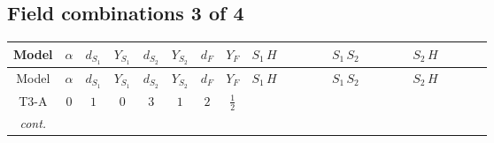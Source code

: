\documentclass[8pt]{article}
\begin{document}
\begin{landscape}
\subsection*{Field combinations 3 of 4}
\begin{longtable}{@{}cccccccc >{\raggedright\arraybackslash}p{0.21\linewidth} >{\raggedright\arraybackslash}p{0.21\linewidth} >{\raggedright\arraybackslash}p{0.21\linewidth}@{}}
\toprule
Model & $\alpha$ & $d_{S_1}$ & $Y_{S_1}$ & $d_{S_2}$ & $Y_{S_2}$ & $d_F$ & $Y_F$ & $S_1\,H$ & $S_1\,S_2$ & $S_2\,H$ \\
\midrule
\endfirsthead
\toprule
Model & $\alpha$ & $d_{S_1}$ & $Y_{S_1}$ & $d_{S_2}$ & $Y_{S_2}$ & $d_F$ & $Y_F$ & $S_1\,H$ & $S_1\,S_2$ & $S_2\,H$ \\
\midrule
\endhead
T3-A & $0$ & $1$ & $0$ & $3$ & $1$ & $2$ & $\frac{1}{2}$ & \scriptsize\adjustbox{max width=\linewidth}{$\begin{gathered} +H_{a_2} S_1 H_{a_1}{}^{\dagger } S_1{}^{\dagger } \mathcal{I}_{H1,a_1,a_2}{}^1 \lambda_{HS_1}^{(1)}^{(1)}\end{gathered}$} & \scriptsize\adjustbox{max width=\linewidth}{$\begin{gathered} +S_1 S_{2,j_2} S_1{}^{\dagger } S_{2,j_1}{}^{\dagger } \mathcal{I}_{12,j_1,j_2}{}^1 \lambda_{12}^{(1)}^{(1)}\end{gathered}$} & \scriptsize\adjustbox{max width=\linewidth}{$\begin{gathered} +\frac{1}{2} H_{a_2} S_{2,j_2} H_{a_1}{}^{\dagger } S_{2,j_1}{}^{\dagger } \mathcal{I}_{H2,a_1,a_2,j_1,j_2}{}^1 \lambda_{HS_2}^{(1)}^{(1)} \\ +\frac{1}{2} H_{a_2} S_{2,j_2} H_{a_1}{}^{\dagger } S_{2,j_1}{}^{\dagger } \mathcal{I}_{H2,a_1,a_2,j_2,j_1}{}^1 \lambda_{HS_2}^{(1)}^{(1)} \\ +\frac{1}{2} H_{a_2} S_{2,j_2} H_{a_1}{}^{\dagger } S_{2,j_1}{}^{\dagger } \mathcal{I}_{H2,a_1,a_2,j_1,j_2}{}^2 \lambda_{HS_2}^{(1)}^{(2)}\end{gathered}$} \\
\textit{cont.} &  &  &  &  &  &  &  &  &  & \scriptsize\adjustbox{max width=\linewidth}{$\begin{gathered} +\frac{1}{2} H_{a_2} S_{2,j_2} H_{a_1}{}^{\dagger } S_{2,j_1}{}^{\dagger } \mathcal{I}_{H2,a_1,a_2,j_2,j_1}{}^2 \lambda_{HS_2}^{(1)}^{(2)}\end{gathered}$} \\
\midrule

\end{longtable}
\end{landscape}
\end{document}
